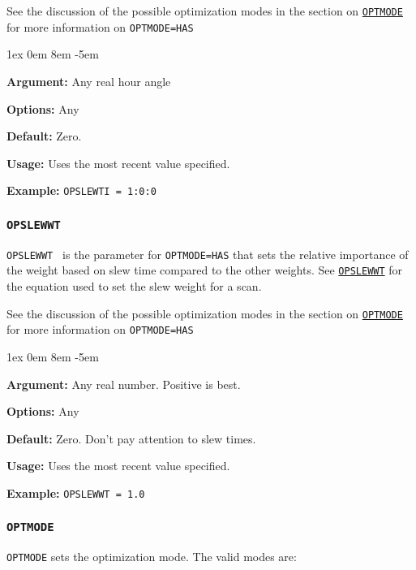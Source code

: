 \documentclass{report}
\newcommand{\rcwbox}[5]{
  \begin{list}{}{\parsep 1ex  \itemsep 0em
                 \leftmargin 8em  \itemindent -5em }
    \item {\bf Argument:} #1
    \item {\bf Options:}  #2
    \item {\bf Default:}  #3
    \item {\bf Usage:}    #4
    \item {\bf Example:}  #5
  \end{list}
}
\begin{document}
See the discussion of the possible optimization modes in the section
on 
{\hyperref[MP:OPTMODE]{{\tt OPTMODE}}} for more information on
{\tt OPTMODE=HAS}

\rcwbox
{Any real hour angle}
{Any}
{Zero.}
{Uses the most recent value specified.}
{{\tt OPSLEWTI = 1:0:0 }}

\subsubsection{\label{MP:OPSLEWWT}{\tt OPSLEWWT}}

{\tt OPSLEWWT } is the parameter for {\tt OPTMODE=HAS} that sets
the relative importance of the weight based on slew time compared to
the other weights.  See 
{\hyperref[MP:OPSLEWWT]{{\tt OPSLEWWT}}} for
the equation used to set the slew weight for a scan.

See the discussion of the possible optimization modes in the section
on 
{\hyperref[MP:OPTMODE]{{\tt OPTMODE}}} for more information on
{\tt OPTMODE=HAS}

\rcwbox
{Any real number.  Positive is best.}
{Any}
{Zero. Don't pay attention to slew times.}
{Uses the most recent value specified.}
{{\tt OPSLEWWT = 1.0}}


\subsubsection{\label{MP:OPTMODE}{\tt OPTMODE}}

{\tt OPTMODE} sets the optimization mode.  The valid modes are:
\end{document}
